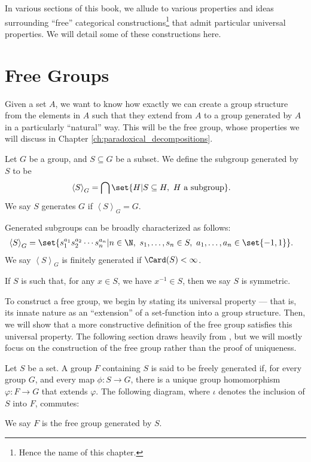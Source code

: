 In various sections of this book, we allude to various properties and ideas surrounding ``free'' categorical constructions\footnote{Hence the name of this chapter.} that admit particular universal properties. We will detail some of these constructions here.
\section{Free Groups}%
Given a set $A$, we want to know how exactly we can create a group structure from the elements in $A$ such that they extend from $A$ to a group generated by $A$ in a particularly ``natural'' way. This will be the free group, whose properties we will discuss in Chapter \ref{ch:paradoxical_decompositions}.
\begin{definition}\label{def:generating_sets}
  Let $G$ be a group, and $S\subseteq G$ be a subset. We define the subgroup {generated by} $S$ to be
  \begin{align*}
    \left\langle S \right\rangle_{G} &= \bigcap \set{H | S\subseteq H,~H\text{ a subgroup}}.
  \end{align*}
  We say $S$ generates $G$ if $\left\langle S \right\rangle_{G} = G$.\newline

  Generated subgroups can be broadly characterized as follows:
  \begin{align*}
    \left\langle S \right\rangle_{G} &= \set{s_1^{a_1}s_2^{a_2}\cdots s_n^{a_n} | n\in\N,~s_1,\dots,s_n\in S,~a_1,\dots,a_n\in \set{-1,1}}.
  \end{align*}
  We say $\left\langle S \right\rangle_{G}$ is finitely generated if $\Card(S) < \infty$.\newline

  If $S$ is such that, for any $x\in S$, we have $x^{-1}\in S$, then we say $S$ is symmetric.
\end{definition}
To construct a free group, we begin by stating its universal property --- that is, its innate nature as an ``extension'' of a set-function into a group structure. Then, we will show that a more constructive definition of the free group satisfies this universal property. The following section draws heavily from \cite{loh_geometric_group_theory}, but we will mostly focus on the construction of the free group rather than the proof of uniqueness.
\begin{definition}\label{def:free_group}
  Let $S$ be a set. A group $F$ containing $S$ is said to be freely generated if, for every group $G$, and every map $\phi\colon S\rightarrow G$, there is a unique group homomorphism $\varphi\colon F\rightarrow G$ that extends $\varphi$. The following diagram, where $\iota$ denotes the inclusion of $S$ into $F$, commutes:
  \begin{center}
  \end{center}
We say $F$ is the {free group} generated by $S$.
\end{definition}
